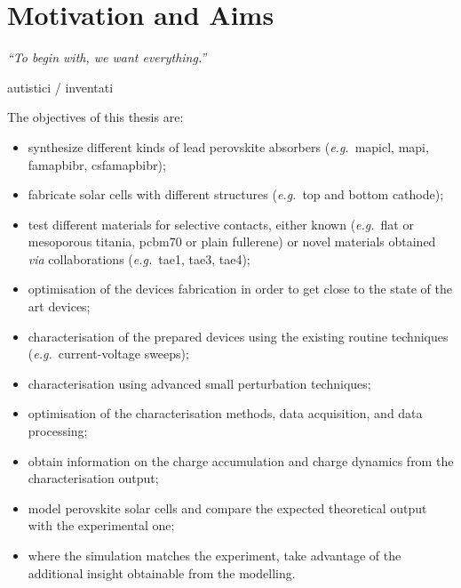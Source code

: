 %
%
%
%

\newpage

\section{Motivation and Aims}\label{sec:aims}
\epigraph{\textit{\enquote{To begin with, we want everything.}}}{autistici / inventati}


The objectives of this thesis are:\nolinebreak
\begin{itemize}
	\item synthesize different kinds of lead perovskite absorbers (\textsl{e.g.}\ \gls{mapicl}, \gls{mapi}, \gls{famapbibr}, \gls{csfamapbibr});
	\item fabricate solar cells with different structures (\textsl{e.g.}\ top and bottom cathode);
	\item test different materials for selective contacts, either known (\textsl{e.g.}\ flat or mesoporous titania, \gls{pcbm70} or plain fullerene) or novel materials obtained \textsl{via} collaborations (\textsl{e.g.}\ \gls{tae1}, \gls{tae3}, \gls{tae4});
	\item optimisation of the devices fabrication in order to get close to the state of the art devices;
	\item characterisation of the prepared devices using the existing routine techniques (\textsl{e.g.}\ current\hyp{}voltage sweeps);
	\item characterisation using advanced small perturbation techniques;
	\item optimisation of the characterisation methods, data acquisition, and data processing;
	\item obtain information on the charge accumulation and charge dynamics from the characterisation output;
	\item model perovskite solar cells and compare the expected theoretical output with the experimental one;
	\item where the simulation matches the experiment, take advantage of the additional insight obtainable from the modelling.	
\end{itemize} 

